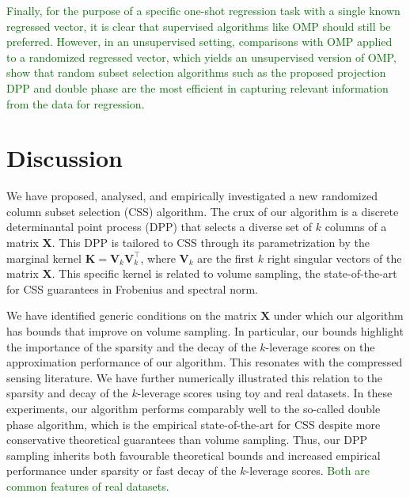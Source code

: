 \documentclass[twoside,11pt]{book}
\newcommand{\rev}[1]{\textcolor{darkgreen}{#1}}
\numberwithin{theorem}{chapter}
\numberwithin{definition}{chapter}
\numberwithin{proposition}{chapter}
\numberwithin{corollary}{chapter}
\numberwithin{example}{chapter}
\numberwithin{lemma}{chapter}
\DeclareMathOperator{\Tran}{\intercal}
\begin{document}
\rev{Finally, for the purpose of a specific one-shot regression task with a single known regressed vector, it is clear that supervised algorithms like OMP should still be preferred. However, in an unsupervised setting, comparisons with OMP applied to a randomized regressed vector, which yields an unsupervised version of OMP, show that random subset selection algorithms such as the proposed projection DPP and double phase are the most efficient in capturing relevant information from the data for regression}.



\section{Discussion} 


We have proposed, analysed, and empirically investigated a new randomized column subset selection (CSS) algorithm. The crux of our algorithm is a discrete determinantal point process (DPP) that selects a diverse set of $k$ columns of a matrix $\bm{X}$. This DPP is tailored to CSS through its parametrization by the marginal kernel $\bm{K} = \bm{V}_{k}\bm{V}_{k}^{\Tran}$, where $\bm{V}_{k}$ are the first $k$ right singular vectors of the matrix $\bm{X}$. This specific kernel is related to volume sampling, the state-of-the-art for CSS guarantees in Frobenius and spectral norm.

We have identified generic conditions on the matrix $\bm{X}$ under which our algorithm has bounds that improve on volume sampling. In particular, our bounds highlight the importance of the sparsity and the decay of the $k$-leverage scores on the approximation performance of our algorithm. This resonates with the compressed sensing literature. We have further numerically illustrated this relation to the sparsity and decay of the $k$-leverage scores using toy and real datasets. In these experiments, our algorithm performs comparably well to the so-called double phase algorithm, which is the empirical state-of-the-art for CSS despite more conservative theoretical guarantees than volume sampling. Thus, our DPP sampling inherits both favourable theoretical bounds and increased empirical performance under sparsity or fast decay of the $k$-leverage scores. \rev{Both are common features of real datasets}.
\end{document}
